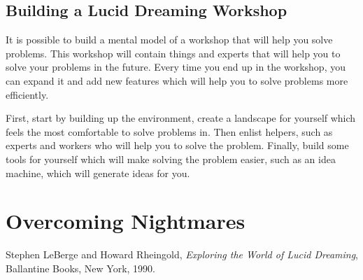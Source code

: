 \documentclass{report}
\begin{document}
\section{Building a Lucid Dreaming Workshop}
It is possible to build a mental model of a workshop that will help you solve problems. This workshop will contain things and experts that will help you to solve your problems in the future. Every time you end up in the workshop, you can expand it and add new features which will help you to solve problems more efficiently.

First, start by building up the environment, create a landscape for yourself which feels the most comfortable to solve problems in. Then enlist helpers, such as experts and workers who will help you to solve the problem. Finally, build some tools for yourself which will make solving the problem easier, such as an idea machine, which will generate ideas for you. 

\chapter{Overcoming Nightmares} 


\begin{thebibliography}{9}

  Stephen LeBerge and Howard Rheingold,
  \textit{Exploring the World of Lucid Dreaming},
  Ballantine Books, New York,
  1990.

\end{thebibliography}
\end{document}
